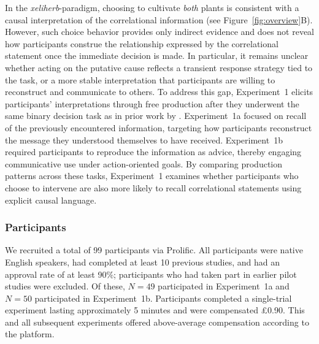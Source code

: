 \documentclass[10pt,letterpaper]{article}
\begin{document}
In the \textit{xeliherb}-paradigm, choosing to cultivate \emph{both} plants is consistent with a causal interpretation of the correlational information (see Figure~\ref{fig:overview}B). 
However, such choice behavior provides only indirect evidence and does not reveal how participants construe the relationship expressed by the correlational statement once the immediate decision is made. 
In particular, it remains unclear whether acting on the putative cause reflects a transient response strategy tied to the task, or a more stable interpretation that participants are willing to reconstruct and communicate to others.
To address this gap, Experiment~1 elicits participants’ interpretations through free production after they underwent the same binary decision task as in prior work by \citet{lassiter2024rationality}.
Experiment~1a focused on recall of the previously encountered information, targeting how participants reconstruct the message they understood themselves to have received. 
Experiment~1b required participants to reproduce the information as advice, thereby engaging communicative use under action-oriented goals. By comparing production patterns across these tasks, Experiment~1 examines whether participants who choose to intervene are also more likely to recall correlational statements using explicit causal language. %

\vspace{-.1in}

\subsubsection{Participants}

We recruited a total of 99 participants via Prolific. All participants were native English speakers, had completed at least 10 previous studies, and had an approval rate of at least 90\%; participants who had taken part in earlier pilot studies were excluded. Of these, $N = 49$ participated in Experiment~1a and $N = 50$ participated in Experiment~1b. Participants completed a single-trial experiment lasting approximately 5 minutes and were compensated \pounds0.90. This and all subsequent experiments offered above-average compensation according to the platform.
\end{document}

